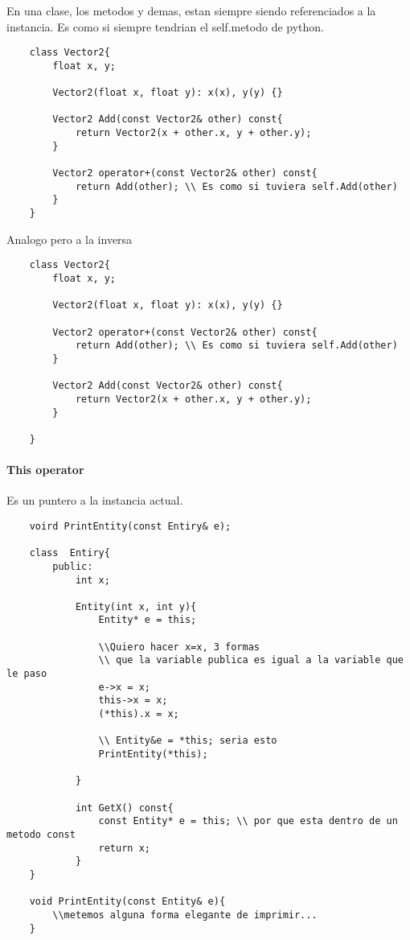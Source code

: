 \documentclass[11pt]{article}
\begin{document}
En una clase, los metodos y demas, estan siempre siendo referenciados a la instancia.
Es como si siempre tendrian el self.metodo de python.
\begin{lstlisting}
    class Vector2{
        float x, y;

        Vector2(float x, float y): x(x), y(y) {}

        Vector2 Add(const Vector2& other) const{
            return Vector2(x + other.x, y + other.y);
        }

        Vector2 operator+(const Vector2& other) const{
            return Add(other); \\ Es como si tuviera self.Add(other)
        }
    }
\end{lstlisting}
Analogo pero a la inversa
\begin{lstlisting}
    class Vector2{
        float x, y;

        Vector2(float x, float y): x(x), y(y) {}

        Vector2 operator+(const Vector2& other) const{
            return Add(other); \\ Es como si tuviera self.Add(other)
        }

        Vector2 Add(const Vector2& other) const{
            return Vector2(x + other.x, y + other.y);
        }

    }
\end{lstlisting}
\paragraph{This operator}
Es un puntero a la instancia actual.
\begin{lstlisting}
    voird PrintEntity(const Entiry& e);

    class  Entiry{
        public:
            int x;

            Entity(int x, int y){
                Entity* e = this;

                \\Quiero hacer x=x, 3 formas
                \\ que la variable publica es igual a la variable que le paso
                e->x = x;
                this->x = x;
                (*this).x = x;

                \\ Entity&e = *this; seria esto
                PrintEntity(*this);

            }

            int GetX() const{
                const Entity* e = this; \\ por que esta dentro de un metodo const
                return x;
            }
    }

    void PrintEntity(const Entity& e){
        \\metemos alguna forma elegante de imprimir...
    }
\end{lstlisting}
\end{document}
